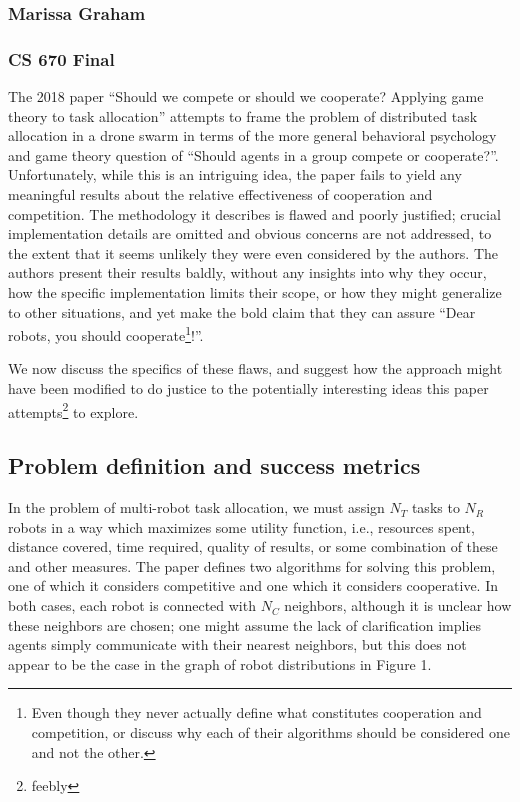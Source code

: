 \documentclass[11pt]{article}
\begin{document}
\subsubsection*{Marissa Graham}
\subsubsection*{CS 670 Final}

\vspace{0.5cm}

The 2018 paper ``Should we compete or should we cooperate? Applying game theory to task allocation'' attempts to frame the problem of distributed task allocation in a drone swarm in terms of the more general behavioral psychology and game theory question of ``Should agents in a group compete or cooperate?''. Unfortunately, while this is an intriguing idea, the paper fails to yield any meaningful results about the relative effectiveness of cooperation and competition. The methodology it describes is flawed and poorly justified; crucial implementation details are omitted and obvious concerns are not addressed, to the extent that it seems unlikely they were even considered by the authors. The authors present their results baldly, without any insights into why they occur, how the specific implementation limits their scope, or how they might generalize to other situations, and yet make the bold claim that they can assure ``Dear robots, you should cooperate\footnote{Even though they never actually define what constitutes cooperation and competition, or discuss why each of their algorithms should be considered one and not the other.}!''. 

We now discuss the specifics of these flaws, and suggest how the approach might have been modified to do justice to the potentially interesting ideas this paper attempts\footnote{feebly} to explore.

\subsection*{Problem definition and success metrics}

In the problem of multi-robot task allocation, we must assign $N_T$ tasks to $N_R$ robots in a way which maximizes some utility function, i.e., resources spent, distance covered, time required, quality of results, or some combination of these and other measures. The paper defines two algorithms for solving this problem, one of which it considers competitive and one which it considers cooperative. In both cases, each robot is connected with $N_C$ neighbors, although it is unclear how these neighbors are chosen; one might assume the lack of clarification implies agents simply communicate with their nearest neighbors, but this does not appear to be the case in the graph of robot distributions in Figure 1. 
\end{document}
